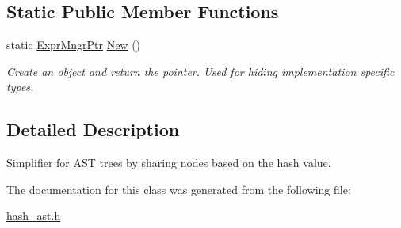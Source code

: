 \subsection*{Static Public Member Functions}
\begin{DoxyCompactItemize}
\item 
\mbox{\label{classilang_1_1_expr_mngr_a0c13e0f27f9e071dec64f1c958405817}} 
static \mbox{\hyperlink{classilang_1_1_expr_mngr_ad35ebf0cecad6f10877667b766bdfac1}{Expr\+Mngr\+Ptr}} \mbox{\hyperlink{classilang_1_1_expr_mngr_a0c13e0f27f9e071dec64f1c958405817}{New}} ()
\begin{DoxyCompactList}\small\item\em Create an object and return the pointer. Used for hiding implementation specific types. \end{DoxyCompactList}\end{DoxyCompactItemize}


\subsection{Detailed Description}
Simplifier for A\+ST trees by sharing nodes based on the hash value. 

The documentation for this class was generated from the following file\+:\begin{DoxyCompactItemize}
\item 
\mbox{\hyperlink{hash__ast_8h}{hash\+\_\+ast.\+h}}\end{DoxyCompactItemize}
